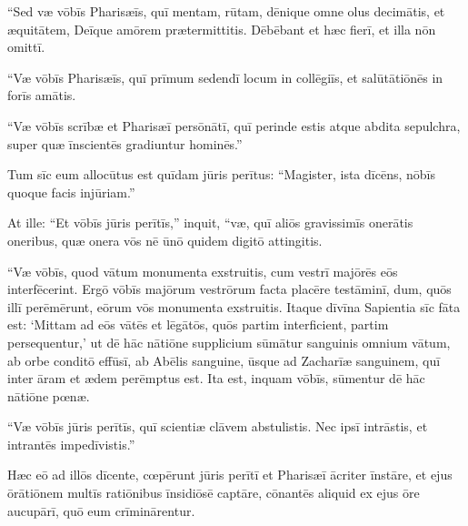 \Versus ``Sed væ vōbīs Pharisæīs, quī mentam, rūtam, dēnique omne olus decimātis, et æquitātem, Deīque amōrem prætermittitis. Dēbēbant et hæc fierī, et illa nōn omittī.

\Versus ``Væ vōbīs Pharisæīs, quī prīmum sedendī locum in collēgiīs, et salūtātiōnēs in forīs amātis.

\Versus ``Væ vōbīs scrībæ et Pharisæī persōnātī, quī perinde estis atque abdita sepulchra, super quæ īnscientēs gradiuntur hominēs.''

\Versus Tum sīc eum allocūtus est quīdam jūris perītus: ``Magister, ista dīcēns, nōbīs quoque facis injūriam.''

\Versus At ille: ``Et vōbīs jūris perītīs,'' inquit, ``væ, quī aliōs gravissimīs onerātis oneribus, quæ onera vōs nē ūnō quidem digitō attingitis.

\Versus ``Væ vōbīs, quod vātum monumenta exstruitis, cum vestrī majōrēs eōs interfēcerint.
\Versus Ergō vōbīs majōrum vestrōrum facta placēre testāminī, dum, quōs illī perēmērunt, eōrum vōs monumenta exstruitis.
\Versus Itaque dīvīna Sapientia sīc fāta est: `Mittam ad eōs vātēs et lēgātōs, quōs partim interficient, partim persequentur,'
\Versus ut dē hāc nātiōne supplicium sūmātur sanguinis omnium vātum, ab orbe conditō effūsī,
\Versus ab Abēlis sanguine, ūsque ad Zacharīæ sanguinem, quī inter āram et ædem perēmptus est. Ita est, inquam vōbīs, sūmentur dē hāc nātiōne pœnæ.

\Versus ``Væ vōbīs jūris perītīs, quī scientiæ clāvem abstulistis. Nec ipsī intrāstis, et intrantēs impedīvistis.''

\Versus Hæc eō ad illōs dīcente, cœpērunt jūris perītī et Pharisæī ācriter īnstāre, et ejus ōrātiōnem multīs ratiōnibus īnsidiōsē captāre,
\Versus cōnantēs aliquid ex ejus ōre aucupārī, quō eum crīminārentur.
